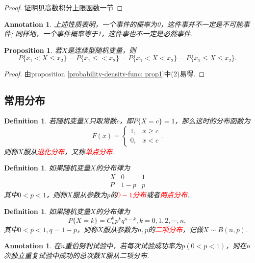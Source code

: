 \documentclass{article}
\newtheorem{proposition}[theorem]{Proposition}
\newtheorem{definition}[theorem]{Definition}
\newtheorem{annotation}[theorem]{Annotation}
\newcommand{\redt}[1]{\textcolor{red}{#1}}
\begin{document}
\begin{proof}
证明见高数积分上限函数一节
\end{proof}

\begin{annotation}
\rm {\color{blue}上述性质表明，一个事件的概率为0，这件事并不一定是不可能事件; 同样地，一个事件概率等于1，这件事也不一定是必然事件}. 
\end{annotation}

\begin{proposition}
\rm 若$X$是连续型随机变量，则
$$
P\{x_1 < X \leq x_2\} = P\{x_1 \leq  < x_2\} = P\{x_1 < X < x_2\} = P\{x_1 \leq  X \leq x_2\}.
$$
\end{proposition}

\begin{proof}
由proposition \ref{probability-density-func: prop1}中(2)易得. 
\end{proof}


\subsection{常用分布}

\begin{definition}
\rm 若随机变量$X$只取常数$c$，即$P\{X=c\} = 1$，那么这时的分布函数为
$$
F(x) = \left\{\begin{array}{ll}
1, &x \geq c \\
0, &x < c
\end{array} \right. .
$$
则称$X$服从\redt{退化分布}，又称\redt{单点分布}. 
\end{definition}

\begin{definition}
\rm 如果随机变量$X$的分布律为
$$
\begin{array}{c|cc}
X & 0 & 1\\
\hline
P & 1-p & p
\end{array}
$$
其中$0 < p < 1$，则称$X$服从参数为$p$的\redt{$0 - 1$分布}或者\redt{两点分布}.
\end{definition}

\begin{definition}
\rm 如果随机变量$X$的分布律为
$$
P\{X = k\} = C_n^kp^kq^{n-k}, k = 0,1,2,\cdots,n,
$$
其中$0 < p < 1, q= 1- p$，则称$X$服从参数为$n,p$的\redt{二项分布}，记做$X \sim B(n,p)$.
\end{definition}

\begin{annotation}
\rm 在$n$重伯努利试验中，若每次试验成功率为$p(0 < p < 1)$，则在$n$次独立重复试验中成功的总次数$X$服从二项分布.
\end{annotation}
\end{document}
